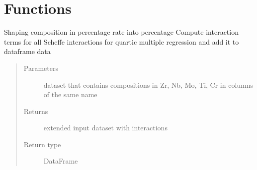 \documentclass[letterpaper,10pt,english]{sphinxmanual}
\begin{document}
\section{Functions}
\label{\detokenize{MultipleRegression:functions}}

\begin{fulllineitems}
\label{\detokenize{MultipleRegression:MultipleRegression.Scheffe_interactions_terms}}
\sphinxAtStartPar
Shaping composition in percentage rate into percentage
Compute interaction terms for all Scheffe interactions for quartic multiple regression and add it to dataframe data
\begin{quote}\begin{description}
\item[{Parameters}] \leavevmode
\sphinxAtStartPar
{} \textendash{} dataset that contains compositions in Zr, Nb, Mo, Ti, Cr in columns of the same name

\item[{Returns}] \leavevmode
\sphinxAtStartPar
extended input dataset with interactions

\item[{Return type}] \leavevmode
\sphinxAtStartPar
DataFrame

\end{description}\end{quote}

\end{fulllineitems}

\end{document}

